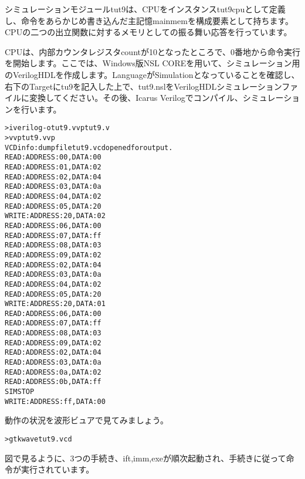シミュレーションモジュールtut9は、CPUをインスタンスtut9cpuとして定義し、命令をあらかじめ書き込んだ主記憶mainmemを構成要素として持ちます。CPUの二つの出立関数に対するメモリとしての振る舞い応答を行っています。

CPUは、内部カウンタレジスタcountが10となったところで、0番地から命令実行を開始します。ここでは、Windows版NSL COREを用いて、シミュレーション用のVerilogHDLを作成します。LanguageがSimulationとなっていることを確認し、右下のTargetにtu9を記入した上で、tut9.nslをVerilogHDLシミュレーションファイルに変換してください。その後、Icarus Verilogでコンパイル、シミュレーションを行います。

\begin{reviewcmd}
\begin{alltt}
\textgreater{} iverilog -otut9.vvp tut9.v
\textgreater{} vvp tut9.vvp
VCD info: dumpfile tut9.vcd opened for output.
READ: ADDRESS:00, DATA:00
READ: ADDRESS:01, DATA:02
READ: ADDRESS:02, DATA:04
READ: ADDRESS:03, DATA:0a
READ: ADDRESS:04, DATA:02
READ: ADDRESS:05, DATA:20
WRITE: ADDRESS:20, DATA:02
READ: ADDRESS:06, DATA:00
READ: ADDRESS:07, DATA:ff
READ: ADDRESS:08, DATA:03
READ: ADDRESS:09, DATA:02
READ: ADDRESS:02, DATA:04
READ: ADDRESS:03, DATA:0a
READ: ADDRESS:04, DATA:02
READ: ADDRESS:05, DATA:20
WRITE: ADDRESS:20, DATA:01
READ: ADDRESS:06, DATA:00
READ: ADDRESS:07, DATA:ff
READ: ADDRESS:08, DATA:03
READ: ADDRESS:09, DATA:02
READ: ADDRESS:02, DATA:04
READ: ADDRESS:03, DATA:0a
READ: ADDRESS:0a, DATA:02
READ: ADDRESS:0b, DATA:ff
SIM STOP
WRITE: ADDRESS:ff, DATA:00
\end{alltt}
\end{reviewcmd}

動作の状況を波形ビュアで見てみましょう。

\begin{reviewcmd}
\begin{alltt}
\textgreater{} gtkwave tut9.vcd
\end{alltt}
\end{reviewcmd}

図で見るように、3つの手続き、ift,imm,exeが順次起動され、手続きに従って命令が実行されています。
